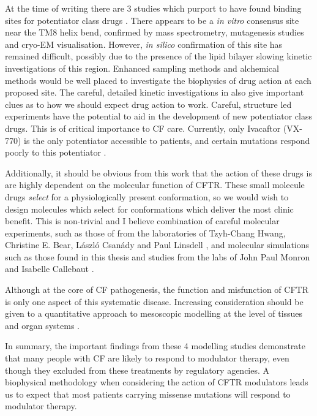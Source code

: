 At the time of writing there are 3 studies which purport to have found binding sites for potentiator class drugs \cite{}. There appears to be a \textit {in vitro} consensus site near the TM8 helix bend, confirmed by mass spectrometry, mutagenesis studies and cryo-EM visualisation. However, \textit{in silico} confirmation of this site has remained difficult, possibly due to the presence of the lipid bilayer slowing kinetic investigations of this region. Enhanced sampling methods and alchemical methods would be well placed to investigate the biophysics of drug action at each proposed site. The careful, detailed kinetic investigations in \cite{csanady2019} also give important clues as to how we should expect drug action to work. Careful, structure led experiments have the potential to aid in the development of new potentiator class drugs. This is of critical importance to CF care. Currently, only Ivacaftor (VX-770)  is the only potentiator accessible to patients, and certain mutations respond poorly to this potentiator \cite{phuan2018, vangoor2014}. 

Additionally, it should be obvious from this work that the action of these drugs is are highly dependent on the molecular function of CFTR. These small molecule drugs \textit{select} for a physiologically present conformation, so we would wish to design molecules which select for conformations which deliver the most clinic benefit. This is non-trivial and I believe  combination of careful molecular experiments, such as those of from the laboratories of Tzyh-Chang Hwang,  Christine E. Bear, L\'aszl\'o Csan\'ady and Paul Linsdell \cite{linsdell2018, csanady2019, zhang2017b}, and molecular simulations such as those found in this thesis and studies from the labs of John Paul Monron and Isabelle Callebaut \cite{hoffmann2018}.

Although at the core of CF pathogenesis, the function and misfunction of CFTR is only one aspect of this systematic disease. Increasing consideration should be given to a quantitative approach to mesoscopic modelling at the level of tissues and organ systems \cite{volt2014}.

In summary, the important findings from these 4 modelling studies demonstrate that many people with CF are likely to respond to modulator therapy, even though they excluded from these treatments by regulatory agencies. A biophysical methodology when considering the action of CFTR modulators leads us to expect that most patients carrying missense mutations will respond to modulator therapy.

